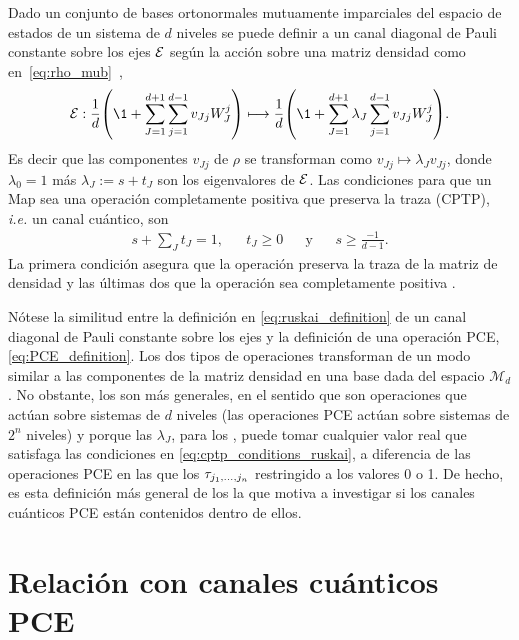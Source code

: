 Dado un conjunto de bases ortonormales mutuamente imparciales del 
espacio de estados de un sistema de $d$ niveles se
puede definir a un canal diagonal de Pauli constante sobre los ejes $\mathcal{E}$ 
según la acción sobre una matriz densidad como 
en~\eqref{eq:rho_mub}~\cite{nathanson2007pauli},
\begin{align}\label{eq:ruskai_definition}
	\E :  \frac{1}{d}\qty(\1+\sum_{J=1}^{d+1}\sum_{j=1}^{d-1} v_{Jj}W_J^j)
	\longmapsto 
	\frac{1}{d}\qty(\1+\sum_{J=1}^{d+1}\lambda_J\sum_{j=1}^{d-1} v_{Jj}W_J^j).
\end{align}
Es decir que las componentes $v_{Jj}$ de $\rho$ se transforman como 
$v_{Jj}\mapsto\lambda_Jv_{Jj}$, donde $\lambda_0=1$ más $\lambda_J:=s+t_J$ son
los eigenvalores de $\mathcal{E}$. Las 
condiciones para que un \ruskai{}{}{}Map{} sea una operación 
completamente positiva que preserva la traza (CPTP), \textit{i.e.} un canal cuántico,
son
\begin{align}\label{eq:cptp_conditions_ruskai}
	s+\sum_{J}t_J=1, && t_J\geq0 && \text{y} && s\geq\frac{-1}{d-1}.
\end{align}
La primera condición asegura que la operación preserva la traza de la matriz 
de densidad y las últimas dos que la operación sea completamente positiva
\cite{nathanson2007pauli}.

Nótese la similitud entre la definición en \eqref{eq:ruskai_definition} 
de un canal diagonal de Pauli constante
sobre los ejes y la definición de una operación PCE, \eqref{eq:PCE_definition}.
Los dos tipos de operaciones transforman de 
un modo similar a las componentes de la matriz densidad en una 
base dada del espacio $\mathcal{M}_d$.
No obstante, los \ruskai{} son más generales, en el sentido que son
operaciones que actúan sobre sistemas de $d$ niveles (las 
operaciones PCE actúan sobre sistemas de $2^n$ niveles) y porque 
las $\lambda_J$, para los \ruskai{}, puede tomar cualquier valor real que 
satisfaga las condiciones en \eqref{eq:cptp_conditions_ruskai}, a diferencia
de las operaciones PCE en las que los $\tau_{j_1,\ldots ,j_n}$ restringido a los valores 0 o 1.
De hecho, es esta definición más general de los \ruskai{} la que motiva a
investigar si los canales cuánticos PCE están contenidos dentro de ellos.

\section{Relación con canales cuánticos PCE} \label{sec:ch4_PCEnotRuskai}%

